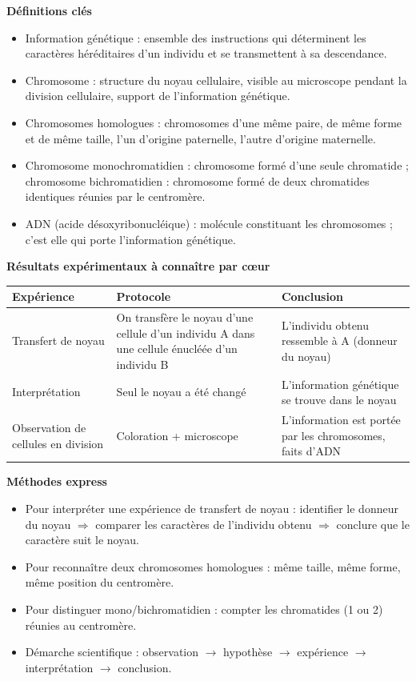 \documentclass[11pt]{article}
\newcommand{\cle}[1]{{\popxbold\color{popdark}#1}}
\begin{document}
\begin{bilan}
\textbf{Définitions clés}
\begin{itemize}
\item \cle{Information génétique} : ensemble des instructions qui déterminent les caractères héréditaires d'un individu et se transmettent à sa descendance.
\item \cle{Chromosome} : structure du noyau cellulaire, visible au microscope pendant la division cellulaire, support de l'information génétique.
\item \cle{Chromosomes homologues} : chromosomes d'une même paire, de même forme et de même taille, l'un d'origine paternelle, l'autre d'origine maternelle.
\item \cle{Chromosome monochromatidien} : chromosome formé d'une seule chromatide ; \cle{chromosome bichromatidien} : chromosome formé de deux chromatides identiques réunies par le centromère.
\item \cle{ADN} (acide désoxyribonucléique) : molécule constituant les chromosomes ; c'est elle qui porte l'information génétique.
\end{itemize}

\textbf{Résultats expérimentaux à connaître par cœur}
\begin{center}
\begin{tabularx}{\linewidth}{|l|X|X|}
\hline
\rowcolor{popblueL} \textbf{Expérience} & \textbf{Protocole} & \textbf{Conclusion} \\
\hline
Transfert de noyau & On transfère le noyau d'une cellule d'un individu A dans une cellule énucléée d'un individu B & L'individu obtenu ressemble à A (donneur du noyau) \\
\hline
Interprétation & Seul le noyau a été changé & L'information génétique se trouve dans le \cle{noyau} \\
\hline
Observation de cellules en division & Coloration + microscope & L'information est portée par les \cle{chromosomes}, faits d'\cle{ADN} \\
\hline
\end{tabularx}
\end{center}

\textbf{Méthodes express}
\begin{itemize}
\item Pour interpréter une expérience de transfert de noyau : identifier le donneur du noyau $\Rightarrow$ comparer les caractères de l'individu obtenu $\Rightarrow$ conclure que le caractère suit le noyau.
\item Pour reconnaître deux chromosomes homologues : même taille, même forme, même position du centromère.
\item Pour distinguer mono/bichromatidien : compter les chromatides (1 ou 2) réunies au centromère.
\item Démarche scientifique : observation $\rightarrow$ hypothèse $\rightarrow$ expérience $\rightarrow$ interprétation $\rightarrow$ conclusion.
\end{itemize}
\end{bilan}
\end{document}
